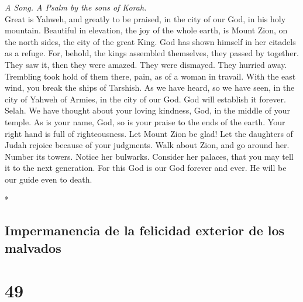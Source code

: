 \begin{paracol}{2}
\begin{otherlanguage}{english}
\emph{A Song. A Psalm by the sons of Korah.}\\
 Great is Yahweh, and greatly to be praised, in the city
of our God, in his holy mountain.  Beautiful in elevation,
the joy of the whole earth, is Mount Zion, on the north sides, the city
of the great King.  God has shown himself in her citadels
as a refuge.  For, behold, the kings assembled themselves,
they passed by together.  They saw it, then they were
amazed. They were dismayed. They hurried away.  Trembling
took hold of them there, pain, as of a woman in travail. 
With the east wind, you break the ships of Tarshish.  As
we have heard, so we have seen, in the city of Yahweh of Armies, in the
city of our God. God will establish it forever. Selah.  We
have thought about your loving kindness, God, in the middle of your
temple.  As is your name, God, so is your praise to the
ends of the earth. Your right hand is full of righteousness.
 Let Mount Zion be glad! Let the daughters of Judah
rejoice because of your judgments.  Walk about Zion, and
go around her. Number its towers.  Notice her bulwarks.
Consider her palaces, that you may tell it to the next generation.
 For this God is our God forever and ever. He will be our
guide even to death.

\end{otherlanguage}

\switchcolumn[0]*

\hypertarget{impermanencia-de-la-felicidad-exterior-de-los-malvados}{%
\subsection{Impermanencia de la felicidad exterior de los
malvados}\label{impermanencia-de-la-felicidad-exterior-de-los-malvados}}

\hypertarget{section-96}{%
\section{49}\label{section-96}}


\end{paracol}
